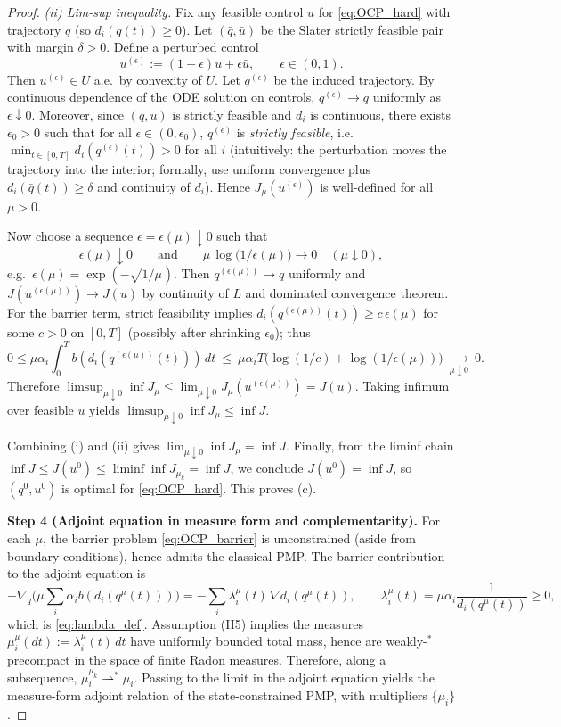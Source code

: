 \begin{proof}
\emph{(ii) {Lim-sup} inequality.}
Fix any feasible control $u$ for \cref{eq:OCP_hard} with trajectory $q$ (so $d_i(q(t))\ge 0$).
Let $(\bar q,\bar u)$ be the Slater strictly feasible pair with margin $\delta>0$.
Define a perturbed control
\[
u^{(\epsilon)} := (1-\epsilon)u+\epsilon \bar u,\qquad \epsilon\in(0,1).
\]
Then $u^{(\epsilon)}\in U$ a.e.\ by convexity of $U$.
Let $q^{(\epsilon)}$ be the induced trajectory.
By continuous dependence of the ODE solution on controls, $q^{(\epsilon)}\to q$ uniformly as $\epsilon\downarrow 0$.
Moreover, since $(\bar q,\bar u)$ is strictly feasible and $d_i$ is continuous, there exists $\epsilon_0>0$ such that
for all $\epsilon\in(0,\epsilon_0)$, $q^{(\epsilon)}$ is \emph{strictly feasible}, i.e.\ $\min_{t\in[0,T]} d_i(q^{(\epsilon)}(t))>0$
for all $i$ (intuitively: the perturbation moves the trajectory into the interior; formally, use uniform convergence plus
$d_i(\bar q(t))\ge\delta$ and continuity of $d_i$).
Hence $J_\mu(u^{(\epsilon)})$ is well-defined for all $\mu>0$.

Now choose a sequence $\epsilon=\epsilon(\mu)\downarrow 0$ such that
\[
\epsilon(\mu)\downarrow 0
\qquad\text{and}\qquad
\mu\,\log\!\big(1/\epsilon(\mu)\big)\to 0\quad(\mu\downarrow 0),
\]
e.g.\ $\epsilon(\mu)=\exp(-\sqrt{1/\mu})$.
Then $q^{(\epsilon(\mu))}\to q$ uniformly and $J(u^{(\epsilon(\mu))})\to J(u)$ by continuity of $L$ and dominated convergence theorem.
For the barrier term, strict feasibility implies $d_i(q^{(\epsilon(\mu))}(t))\ge c\,\epsilon(\mu)$ for some $c>0$
on $[0,T]$ (possibly after shrinking $\epsilon_0$); thus
\[
0\le \mu\alpha_i\int_0^T b(d_i(q^{(\epsilon(\mu))}(t)))\,dt
\ \le\ \mu\alpha_i T\big(\log(1/c)+\log(1/\epsilon(\mu))\big)\ \xrightarrow[\mu\downarrow 0]{}\ 0.
\]
Therefore $\limsup_{\mu\downarrow 0}\inf J_\mu \le \lim_{\mu\downarrow 0} J_\mu(u^{(\epsilon(\mu))}) = J(u)$.
Taking infimum over feasible $u$ yields $\limsup_{\mu\downarrow 0}\inf J_\mu \le \inf J$.

Combining (i) and (ii) gives $\lim_{\mu\downarrow 0}\inf J_\mu = \inf J$.
Finally, from the liminf chain $\inf J \le J(u^0)\le \liminf \inf J_{\mu_k}=\inf J$, we conclude $J(u^0)=\inf J$,
so $(q^0,u^0)$ is optimal for \cref{eq:OCP_hard}. This proves (c).

\textbf{Step 4 {(Adjoint equation in measure form and complementarity)}.}
For each $\mu$, the barrier problem \cref{eq:OCP_barrier} is unconstrained (aside from boundary conditions), hence admits the classical PMP.
The barrier contribution to the adjoint equation is
\[
-\nabla_q\Big(\mu\sum_i \alpha_ib(d_i(q^\mu(t)))\Big)
= -\sum_i \lambda_i^\mu(t)\,\nabla d_i(q^\mu(t)),
\qquad
\lambda_i^\mu(t)=\mu\alpha_i\frac{1}{d_i(q^\mu(t))}\ge 0,
\]
which is \cref{eq:lambda_def}.
Assumption (H5) implies the measures $\mu_i^\mu(dt):=\lambda_i^\mu(t)\,dt$ have uniformly bounded total mass, hence are weakly-$^\ast$
precompact in the space of finite Radon measures. Therefore, along a subsequence, $\mu_i^{\mu_k}\rightharpoonup^\ast \mu_i$.
Passing to the limit in the adjoint equation yields the measure-form adjoint relation of the state-constrained PMP, with multipliers $\{\mu_i\}$.


\end{proof}
